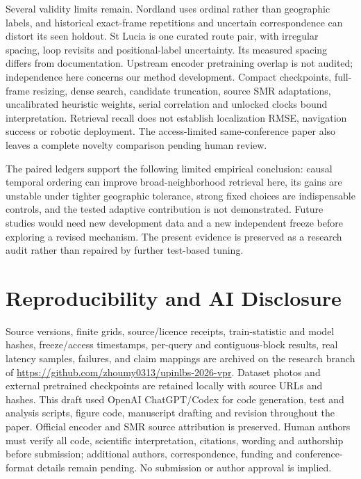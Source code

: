 \documentclass[conference]{IEEEtran}
\begin{document}
Several validity limits remain. Nordland uses ordinal rather than geographic labels, and historical exact-frame repetitions and uncertain correspondence can distort its seen holdout. St Lucia is one curated route pair, with irregular spacing, loop revisits and positional-label uncertainty. Its measured spacing differs from documentation. Upstream encoder pretraining overlap is not audited; independence here concerns our method development. Compact checkpoints, full-frame resizing, dense search, candidate truncation, source SMR adaptations, uncalibrated heuristic weights, serial correlation and unlocked clocks bound interpretation. Retrieval recall does not establish localization RMSE, navigation success or robotic deployment. The access-limited same-conference paper also leaves a complete novelty comparison pending human review.

The paired ledgers support the following limited empirical conclusion: causal temporal ordering can improve broad-neighborhood retrieval here, its gains are unstable under tighter geographic tolerance, strong fixed choices are indispensable controls, and the tested adaptive contribution is not demonstrated. Future studies would need new development data and a new independent freeze before exploring a revised mechanism. The present evidence is preserved as a research audit rather than repaired by further test-based tuning.

\section*{Reproducibility and AI Disclosure}
Source versions, finite grids, source/licence receipts, train-statistic and model hashes, freeze/access timestamps, per-query and contiguous-block results, real latency samples, failures, and claim mappings are archived on the research branch of \url{https://github.com/zhoumy0313/upinlbs-2026-vpr}. Dataset photos and external pretrained checkpoints are retained locally with source URLs and hashes. This draft used OpenAI ChatGPT/Codex for code generation, test and analysis scripts, figure code, manuscript drafting and revision throughout the paper. Official encoder and SMR source attribution is preserved. Human authors must verify all code, scientific interpretation, citations, wording and authorship before submission; additional authors, correspondence, funding and conference-format details remain pending. No submission or author approval is implied.
\end{document}
